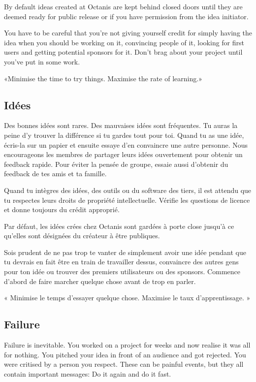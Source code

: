 	By default ideas created at Octanis are kept behind closed doors until they are deemed ready for public release or if you have permission from the idea initiator.

	You have to be careful that you're not giving yourself credit for simply having the idea when you should be working on it, convincing people of it, looking for first users and getting potential sponsors for it. Don't brag about your project until you've put in some work.

	«Minimise the time to try things. Maximise the rate of learning.»





\french
	\subsection{Idées}
	Des bonnes idées sont rares. Des mauvaises idées sont fréquentes. Tu auras la peine d'y trouver la différence si tu gardes tout pour toi. 
	Quand tu as une idée, écris-la sur un papier et ensuite essaye d'en convaincre une autre personne. Nous encourageons les membres de partager leurs idées ouvertement pour obtenir un feedback rapide. Pour éviter la pensée de groupe, essaie aussi d'obtenir du feedback de tes amis et ta famille. 

	Quand tu intègres des idées, des outils ou du software des tiers, il est attendu que tu respectes leurs droits de propriété intellectuelle. Vérifie les questions de licence et donne toujours du crédit approprié.

	Par défaut, les idées crées chez Octanis sont gardées à porte close jusqu'à ce qu'elles sont désignées du créateur à être publiques. 

	Sois prudent de ne pas trop te vanter de simplement avoir une idée pendant que tu devrais en fait être en train de travailler dessus, convaincre des autres gens pour ton idée ou trouver des premiers utilisateurs ou des sponsors. Commence d'abord de faire marcher quelque chose avant de trop en parler. 

	« Minimise le temps d'essayer quelque chose. Maximise le taux d'apprentissage. »




\english
	\subsection{Failure}
	Failure is inevitable. You worked on a project for weeks and now realise it was all for nothing. You pitched your idea in front of an audience and got rejected. You were critised by a person you respect. 
	These can be painful events, but they all contain important messages: Do it again and do it fast.


